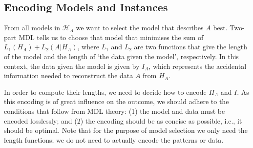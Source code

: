 \documentclass{llncs}
\begin{document}

\subsection{Encoding Models and Instances}

From all models in $\mathcal{H}_A$ we want to select the model that describes $A$ best. Two-part MDL \cite{grunwaldmdl} tells us to choose that model that minimises the sum of  $L_1(H_A) + L_2(A|H_A)$, where $L_1$ and $L_2$ are two functions that give the length of the model and the length of `the data given the model', respectively. In this context, the data given the model is given by $I_A$, which represents the accidental information needed to reconstruct the data $A$ from $H_A$.

In order to compute their lengths, we need to decide how to encode $H_A$ and $I$. As this encoding is of great influence on the outcome, we should adhere to the conditions that follow from MDL theory: (1) the model and data must be encoded losslessly; and (2) the encoding should be as concise as possible, i.e., it should be optimal. Note that for the purpose of model selection we only need the length functions; we do not need to actually encode the patterns or data.
\end{document}
